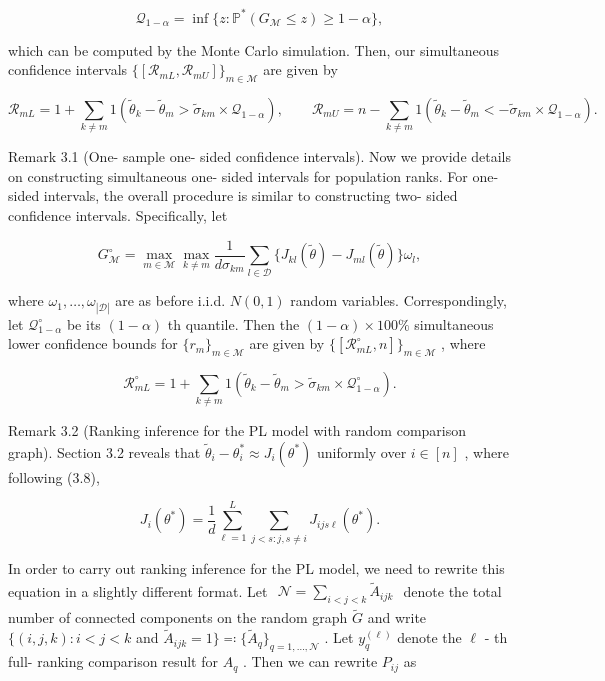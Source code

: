 \[
\mathcal{Q}_{1 - \alpha} = \inf \{z: \mathbb{P}^{*}(G_{\mathcal{M}} \leq z) \geq 1 - \alpha \} ,
\]

which can be computed by the Monte Carlo simulation. Then, our
simultaneous confidence intervals
\(\{[\mathcal{R}_{mL}, \mathcal{R}_{mU}] \}_{m \in \mathcal{M}}\) are
given by

\[
\mathcal{R}_{mL} = 1 + \sum_{k \neq m} 1 \left(\widetilde{\theta}_{k} - \widetilde{\theta}_{m} > \widetilde{\sigma}_{km} \times \mathcal{Q}_{1 - \alpha}\right), \qquad \mathcal{R}_{mU} = n - \sum_{k \neq m} 1 \left(\widetilde{\theta}_{k} - \widetilde{\theta}_{m} < -\widetilde{\sigma}_{km} \times \mathcal{Q}_{1 - \alpha}\right).
\]

Remark 3.1 (One- sample one- sided confidence intervals). Now we provide
details on constructing simultaneous one- sided intervals for population
ranks. For one- sided intervals, the overall procedure is similar to
constructing two- sided confidence intervals. Specifically, let

\[
G_{\mathcal{M}}^{\circ} = \max_{m \in \mathcal{M}} \max_{k \neq m} \frac{1}{d \sigma_{km}} \sum_{l \in \mathcal{D}} \{J_{kl}(\widetilde{\theta}) - J_{ml}(\widetilde{\theta})\} \omega_{l}, \tag{3.16}
\]

where \(\omega_{1}, \ldots , \omega_{|\mathcal{D}|}\) are as before
i.i.d. \(N(0,1)\) random variables. Correspondingly, let
\(\mathcal{Q}_{1 - \alpha}^{\circ}\) be its \((1 - \alpha)\) th
quantile. Then the \((1 - \alpha) \times 100\%\) simultaneous lower
confidence bounds for \(\{r_{m}\}_{m \in \mathcal{M}}\) are given by
\(\{[\mathcal{R}_{mL}^{ \circ }, n] \}_{m \in \mathcal{M}}\) , where

\[
\mathcal{R}_{mL}^{\circ} = 1 + \sum_{k \neq m} 1 \left(\widetilde{\theta}_{k} - \widetilde{\theta}_{m} > \widetilde{\sigma}_{km} \times \mathcal{Q}_{1 - \alpha}^{\circ}\right). \tag{3.17}
\]

Remark 3.2 (Ranking inference for the PL model with random comparison
graph). Section 3.2 reveals that
\(\widetilde{\theta}_{i} - \theta_{i}^{*} \approx J_{i}(\theta^{*})\)
uniformly over \(i \in [n]\) , where following (3.8),

\[
J_{i}(\theta^{*}) = \frac{1}{d} \sum_{\ell = 1}^{L} \sum_{j < s:j, s \neq i} J_{ijs\ell}(\theta^{*}).
\]

In order to carry out ranking inference for the PL model, we need to
rewrite this equation in a slightly different format. Let
\(\begin{array}{r}{\mathcal{N} = \sum_{i< j< k}\widetilde{A}_{i j k}} \end{array}\)
denote the total number of connected components on the random graph
\(\widetilde{G}\) and write \(\{(i,j,k):i< j< k\) and
\(\widetilde{A}_{i j k} = 1\} \eqqcolon \{\widetilde{A}_{q}\}_{q = 1,\ldots ,\mathcal{N}}\)
. Let \(y_{q}^{(\ell)}\) denote the \(\ell\) - th full- ranking
comparison result for \(A_{q}\) . Then we can rewrite \(P_{ij}\) as

